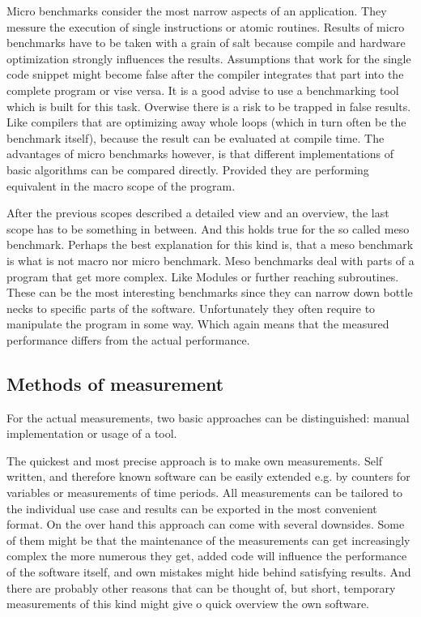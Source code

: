 Micro benchmarks consider the most narrow aspects of an application. They messure the execution of single instructions or atomic routines. Results of micro benchmarks have to be taken with a grain of salt because compile and hardware optimization strongly influences the results. Assumptions that work for the single code snippet might become false after the compiler integrates that part into the complete program or vise versa. It is a good advise to use a benchmarking tool which is built for this task. Overwise there is a risk to be trapped in false results. Like compilers that are optimizing away whole loops (which in turn often be the benchmark itself), because the result can be evaluated at compile time. The advantages of micro benchmarks however, is that different implementations of basic algorithms can be compared directly. Provided they are performing equivalent in the macro scope of the program.

After the previous scopes described a detailed view and an overview, the last scope has to be something in between. And this holds true for the so called meso benchmark. Perhaps the best explanation for this kind is, that a meso benchmark is what is not macro nor micro benchmark. Meso benchmarks deal with parts of a program that get more complex. Like Modules or further reaching subroutines. These can be the most interesting benchmarks since they can narrow down bottle necks to specific parts of the software. Unfortunately they often require to manipulate the program in some way. Which again means that the measured performance differs from the actual performance.


\subsection{Methods of measurement}
\label{BenchMethods}
For the actual measurements, two basic approaches can be distinguished: manual implementation or usage of a tool.

The quickest and most precise approach is to make own measurements. Self written, and therefore known software can be easily extended e.g. by counters for variables or measurements of time periods. All measurements can be tailored to the individual use case and results can be exported in the most convenient format. On the over hand this approach can come with several downsides. Some of them might be that the maintenance of the measurements can get increasingly complex the more numerous they get, added code will influence the performance of the software itself, and own mistakes might hide behind satisfying results. And there are probably other reasons that can be thought of, but short, temporary measurements of this kind might give o quick overview the own software.


